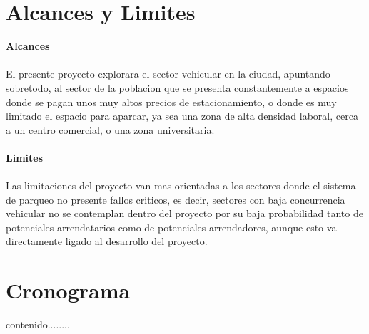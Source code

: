 \section{Alcances y Limites}
\large \textbf{Alcances}  \\
\\
El presente proyecto explorara el sector vehicular en la ciudad, apuntando sobretodo, al sector de la poblacion que se presenta constantemente a espacios donde se pagan unos muy altos precios de estacionamiento, o donde es muy limitado el espacio para aparcar, ya sea una zona de alta densidad laboral, cerca a un centro comercial, o una zona universitaria.
\\
\\
\large \textbf{Limites}  \\
\\
Las limitaciones del proyecto van mas orientadas a los sectores donde el sistema de parqueo no presente fallos criticos, es decir, sectores con baja concurrencia vehicular no se contemplan dentro del proyecto por su baja probabilidad tanto de potenciales arrendatarios como de potenciales arrendadores, aunque esto va directamente ligado al desarrollo del proyecto. 
\newpage

\section{Cronograma}
contenido........

\newpage